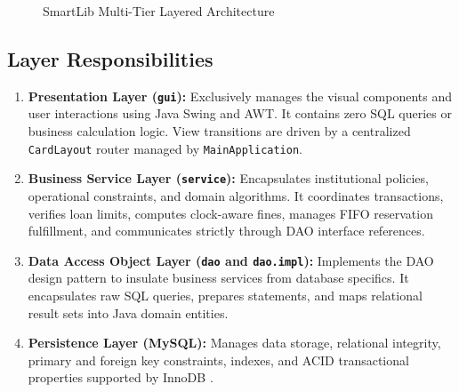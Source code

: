 \begin{figure}[h!]
\caption{SmartLib Multi-Tier Layered Architecture}
\label{fig:system_architecture}
\end{figure}

\subsection{Layer Responsibilities}
\begin{enumerate}
    \item \textbf{Presentation Layer (\texttt{gui}):} Exclusively manages the visual components and user interactions using Java Swing and AWT. It contains zero SQL queries or business calculation logic. View transitions are driven by a centralized \texttt{CardLayout} router managed by \texttt{MainApplication}.
    \item \textbf{Business Service Layer (\texttt{service}):} Encapsulates institutional policies, operational constraints, and domain algorithms. It coordinates transactions, verifies loan limits, computes clock-aware fines, manages FIFO reservation fulfillment, and communicates strictly through DAO interface references.
    \item \textbf{Data Access Object Layer (\texttt{dao} and \texttt{dao.impl}):} Implements the DAO design pattern to insulate business services from database specifics. It encapsulates raw SQL queries, prepares statements, and maps relational result sets into Java domain entities.
    \item \textbf{Persistence Layer (MySQL):} Manages data storage, relational integrity, primary and foreign key constraints, indexes, and ACID transactional properties supported by InnoDB \cite{mysql2023manual}.
\end{enumerate}

